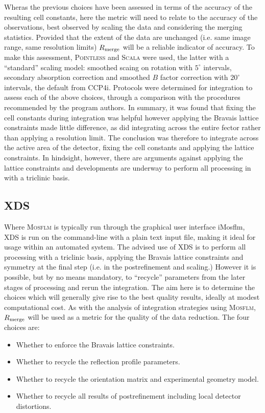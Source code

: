 \documentclass[preprint,pdf]{iucr}
\begin{document}
Wheras the previous choices have been assessed in terms of the accuracy
of the resulting cell constants, here the metric will need to relate
to the accuracy of the observations, best observed by scaling the data
and considering the merging statistics. Provided that the extent of
the data are unchanged (i.e. same image range, same resolution limits)
$R_{\rm{merge}}$ will be a reliable indicator of accuracy. To make
this assessment, \textsc{Pointless} \cite{Evans:ba5084} and \textsc{Scala} were
used, the latter with a ``standard'' scaling model: smoothed
scaing on rotation with $5^{\circ}$ intervals, secondary absorption
correction and smoothed $B$ factor correction with $20^{\circ}$
intervals, the default from CCP4i.
Protocols were determined for integration to assess each
of the above choices, through a 
comparison with the procedures recommended
by the program authors. In summary, it was found that fixing the cell
constants during integration was helpful however applying the Bravais
lattice constraints made little difference, as did integrating across
the entire fector rather than applying a resolution limit.
The conclusion was therefore to integrate across the
active area of the detector, fixing the cell constants and applying
the lattice constraints. In hindsight, however, there are arguments
against applying the lattice constraints
and developments are underway to perform all
processing in with a triclinic basis.

\subsection{XDS}

Where \textsc{Mosflm} is typically run through the graphical user interface
iMosflm, XDS is run on the command-line with a plain text input file,
making it ideal for usage 
within an automated system. The advised use of XDS is to perform all
processing with a triclinic basis, applying the Bravais lattice
constraints and symmetry
at the final step (i.e. in the postrefinement and scaling.) However it
is possible, but by no means mandatory, to ``recycle'' parameters from
the later stages of processing and rerun the integration. The aim here
is to determine the choices which will generally give rise to the best
quality results, ideally at modest computational cost. As with the
analysis of integration strategies using \textsc{Mosflm}, $R_{\rm{merge}}$ will
be used as a metric for the quality of the data reduction. The four
choices are:

\begin{itemize}
\item{Whether to enforce the Bravais lattice constraints.}
\item{Whether to recycle the reflection profile parameters.}
\item{Whether to recycle the orientation matrix and experimental
    geometry model.}
\item{Whether to recycle all results of postrefinement including local
    detector distortions.}
\end{itemize}
\end{document}
